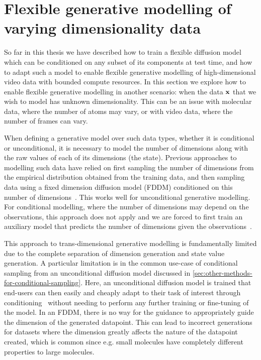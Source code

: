 \newtheorem{proposition}{Proposition}
\newtheorem{lemma}{Lemma}
\newtheorem{assumption}{Assumption}

\chapter{Flexible generative modelling of varying dimensionality data}
\label{ch:tddm}

So far in this thesis we have described how to train a flexible diffusion model which can be conditioned on any subset of its components at test time, and how to adapt such a model to enable flexible generative modelling of high-dimensional video data with bounded compute resources. In this section we explore how to enable flexible generative modelling in another scenario: when the data ${\mathbf{x}}$ that we wish to model has unknown dimensionality. This can be an issue with molecular data, where the number of atoms may vary, or with video data, where the number of frames can vary. 

When defining a generative model over such data types, whether it is conditional or unconditional, it is necessary to model the number of dimensions along with the raw values of each of its dimensions (the state). Previous approaches to modelling such data have relied on first sampling the number of dimensions from the empirical distribution obtained from the training data, and then sampling data using a fixed dimension diffusion model (FDDM) conditioned on this number of dimensions~\cite{hoogeboom2022equivariant}. This works well for unconditional generative modelling. For conditional modelling, where the number of dimensions may depend on the observations, this approach does not apply and we are forced to first train an auxiliary model that predicts the number of dimensions given the observations~\cite{igashov2022equivariant}.

This approach to trans-dimensional generative modelling is fundamentally limited due to the complete separation of dimension generation and state value generation. A particular limitation is in the common use-case of conditional sampling from an unconditional diffusion model discussed in \cref{sec:other-methods-for-conditional-sampling}. Here, an unconditional diffusion model is trained that end-users can then easily and cheaply adapt to their task of interest through conditioning~\cite{song2020score, dhariwal2021diffusion, clip_guided_diffusion, zhang2023towards} without needing to perform any further training or fine-tuning of the model. In an FDDM, there is no way for the guidance to appropriately guide the dimension of the generated datapoint. This can lead to incorrect generations for datasets where the dimension greatly affects the nature of the datapoint created, which is common since e.g. small molecules have completely different properties to large molecules.

